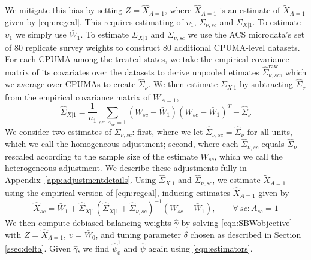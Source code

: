 \documentclass[aoas]{imsart}
\theoremstyle{plain}
\theoremstyle{remark}
\begin{document}
We mitigate this bias by setting $Z = \hat{X}_{A=1}$, where $\hat{X}_{A=1}$ is an estimate of $\tilde{X}_{A=1}$ given by \eqref{eqn:regcal}. This requires estimating of $\upsilon_1$, $\Sigma_{\nu, sc}$ and $\Sigma_{X|1}$. To estimate $\upsilon_1$ we simply use $\bar{W}_1$. To estimate $\Sigma_{X|1}$ and $\Sigma_{\nu,sc}$ we use the ACS microdata's set of 80 replicate survey weights to construct 80 additional CPUMA-level datasets. For each CPUMA among the treated states, we take the empirical covariance matrix of its covariates over the datasets to derive unpooled etimates $\hat{\Sigma}_{\nu,sc}^{\text{raw}}$, which we average over CPUMAs to create $\hat{\Sigma}_{\nu}$. We then estimate $\Sigma_{X|1}$ by subtracting $\hat{\Sigma}_{\nu}$ from the empirical covariance matrix of $W_{A=1}$,
\[ \hat{\Sigma}_{X|1} = \frac{1}{n_1} \sum_{sc:A_{sc}=1} (W_{sc} - \bar{W}_1)(W_{sc} - \bar{W}_1)^T - \hat{\Sigma}_{\nu}\]
We consider two estimates of $\Sigma_{\nu, sc}$: first, where we let $\hat{\Sigma}_{\nu,sc} = \hat{\Sigma}_{\nu}$ for all units, which we call the homogeneous adjustment; second, where each $\hat{\Sigma}_{\nu, sc}$ equals $\hat{\Sigma}_{\nu}$ rescaled according to the sample size of the estimate $W_{sc}$, which we call the heterogeneous adjustment. We describe these adjustments fully in Appendix~\ref{app:adjustmentdetails}. Using $\hat{\Sigma}_{X|1}$ and $\hat{\Sigma}_{\nu, sc}$, we estimate $\tilde{X}_{A=1}$ using the empirical version of \eqref{eqn:regcal}, inducing estimates $\hat{X}_{A=1}$ given by
\begin{equation}\label{eqn:hatX}
\hat{X}_{sc} = \bar{W}_1 + \hat{\Sigma}_{X|1} (\hat{\Sigma}_{X|1} + \hat{\Sigma}_{\nu,sc})^{-1}  (W_{sc} - \bar{W}_1), \qquad \forall\, sc: A_{sc}=1
\end{equation}
We then compute debiased balancing weights $\hat{\gamma}$ by solving \eqref{eqn:SBWobjective} with $Z = \hat{X}_{A=1}$, $\upsilon = \bar{W}_0$, and tuning parameter $\delta$ chosen as described in Section \ref{ssec:delta}. Given $\hat{\gamma}$, we find $\hat{\psi}_0^1$ and $\hat{\psi}$ again using \eqref{eqn:estimators}.%
\end{document}
